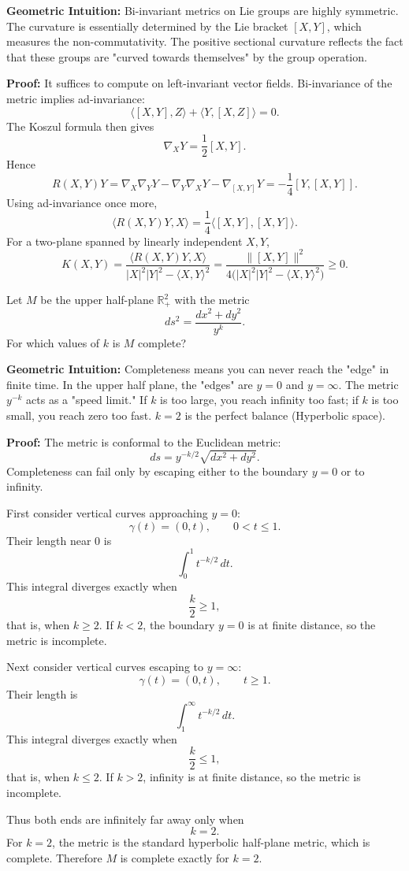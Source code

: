 \begin{solution}
\textbf{Geometric Intuition:} Bi-invariant metrics on Lie groups are highly symmetric. The curvature is essentially determined by the Lie bracket $[X, Y]$, which measures the non-commutativity. The positive sectional curvature reflects the fact that these groups are "curved towards themselves" by the group operation.

\textbf{Proof:}
It suffices to compute on left-invariant vector fields. Bi-invariance of the metric implies ad-invariance:
\[
\langle [X,Y],Z\rangle+\langle Y,[X,Z]\rangle=0.
\]
The Koszul formula then gives
\[
\nabla_XY=\frac{1}{2}[X,Y].
\]
Hence
\[
R(X,Y)Y
=\nabla_X\nabla_YY-\nabla_Y\nabla_XY-\nabla_{[X,Y]}Y
=-\frac{1}{4}[Y,[X,Y]].
\]
Using ad-invariance once more,
\[
\langle R(X,Y)Y,X\rangle
=\frac{1}{4}\langle [X,Y],[X,Y]\rangle.
\]
For a two-plane spanned by linearly independent $X,Y$,
\[
K(X,Y)
=
\frac{\langle R(X,Y)Y,X\rangle}
{|X|^2|Y|^2-\langle X,Y\rangle^2}
=
\frac{\|[X,Y]\|^2}
{4\bigl(|X|^2|Y|^2-\langle X,Y\rangle^2\bigr)}
\geq 0.
\]
\end{solution}

\begin{exercise}
\label{geometry:2014:11}
Let $M$ be the upper half-plane $\mathbb{R}_{+}^{2}$ with the metric
\[ ds^{2} = \frac{dx^{2} + dy^{2}}{y^{k}}. \]
For which values of $k$ is $M$ complete?
\end{exercise}

\begin{solution}
\textbf{Geometric Intuition:} Completeness means you can never reach the "edge" in finite time. In the upper half plane, the "edges" are $y=0$ and $y=\infty$. The metric $y^{-k}$ acts as a "speed limit." If $k$ is too large, you reach infinity too fast; if $k$ is too small, you reach zero too fast. $k=2$ is the perfect balance (Hyperbolic space).

\textbf{Proof:}
The metric is conformal to the Euclidean metric:
\[
ds=y^{-k/2}\sqrt{dx^2+dy^2}.
\]
Completeness can fail only by escaping either to the boundary $y=0$ or to infinity.

First consider vertical curves approaching $y=0$:
\[
\gamma(t)=(0,t),\qquad 0<t\leq 1.
\]
Their length near $0$ is
\[
\int_0^1 t^{-k/2}\,dt.
\]
This integral diverges exactly when
\[
\frac{k}{2}\geq 1,
\]
that is, when $k\geq 2$. If $k<2$, the boundary $y=0$ is at finite distance, so the metric is incomplete.

Next consider vertical curves escaping to $y=\infty$:
\[
\gamma(t)=(0,t),\qquad t\geq 1.
\]
Their length is
\[
\int_1^\infty t^{-k/2}\,dt.
\]
This integral diverges exactly when
\[
\frac{k}{2}\leq 1,
\]
that is, when $k\leq 2$. If $k>2$, infinity is at finite distance, so the metric is incomplete.

Thus both ends are infinitely far away only when
\[
k=2.
\]
For $k=2$, the metric is the standard hyperbolic half-plane metric, which is complete. Therefore $M$ is complete exactly for $k=2$.
\end{solution}
